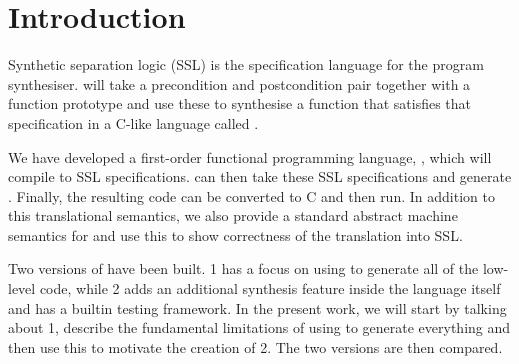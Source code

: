 \section{Introduction}

Synthetic separation logic (SSL) is the specification language for the \SuSLik{} program synthesiser. \SuSLik{} will take a precondition and postcondition pair together
with a function prototype and use these to synthesise a function that satisfies that specification in a C-like language called \SuSLang.

We have developed a first-order functional programming language, \Pika, which will compile to SSL specifications. \SuSLik{} can then take these SSL specifications and generate \SuSLang. Finally, the resulting \SuSLang{} code can be converted to C and then run. In addition to this translational semantics, we also provide a standard abstract machine semantics for \Pika{} and use this to show correctness of the translation into SSL.

Two versions of \Pika{} have been built. \Pika{} 1 has a focus on using \SuSLik{} to generate all of the low-level code, while \Pika{} 2 adds an additional synthesis feature inside the \Pika{} language itself and has a builtin testing framework. In the present work, we will start by talking about \Pika{} 1, describe the fundamental limitations of using \SuSLik{} to generate everything and then use this to motivate the creation of \Pika{} 2. The two versions are then compared.

